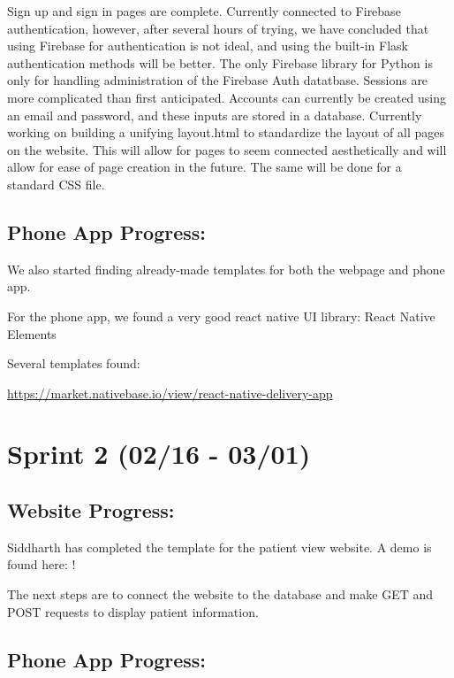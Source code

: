 \documentclass[]{book}
\begin{document}
Sign up and sign in pages are complete. Currently connected to Firebase
authentication, however, after several hours of trying, we have
concluded that using Firebase for authentication is not ideal, and using
the built-in Flask authentication methods will be better. The only
Firebase library for Python is only for handling administration of the
Firebase Auth datatbase. Sessions are more complicated than first
anticipated. Accounts can currently be created using an email and
password, and these inputs are stored in a database. Currently working
on building a unifying layout.html to standardize the layout of all
pages on the website. This will allow for pages to seem connected
aesthetically and will allow for ease of page creation in the future.
The same will be done for a standard CSS file.

\subsection{Phone App Progress:}\label{phone-app-progress}

We also started finding already-made templates for both the webpage and
phone app.

For the phone app, we found a very good react native UI library: React
Native Elements

Several templates found:

\url{https://market.nativebase.io/view/react-native-delivery-app}

\section{Sprint 2 (02/16 - 03/01)}\label{sprint-2-0216---0301}

\subsection{Website Progress:}\label{website-progress-1}

Siddharth has completed the template for the patient view website. A
demo is found here: !

The next steps are to connect the website to the database and make GET
and POST requests to display patient information.

\subsection{Phone App Progress:}\label{phone-app-progress-1}
\end{document}
